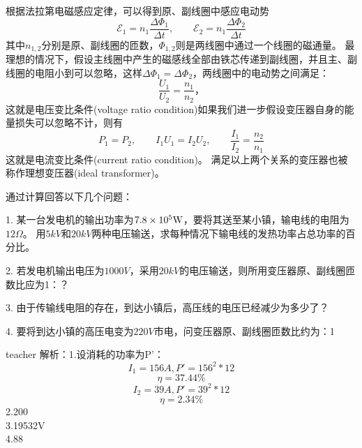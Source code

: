 根据法拉第电磁感应定律，可以得到原、副线圈中感应电动势
\[
\mathcal{E}_1 = n_1\frac{\Delta \Phi_1}{\Delta t},\qquad \mathcal{E}_2 = n_1\frac{\Delta \Phi_2}{\Delta t}
\]
其中$n_{1,2}$分别是原、副线圈的匝数，$\Phi_{1,2}$则是两线圈中通过一个线圈的磁通量。
最理想的情况下，假设主线圈中产生的磁感线全部由铁芯传递到副线圈，并且主、副线圈的电阻小到可以忽略，这样$\Delta\Phi_1 = \Delta \Phi_2$，两线圈中的电动势之间满足：
\begin{equation}
\frac{U_1}{U_2} = \frac{n_1}{n_2}，
\end{equation}
这就是{\heiti 电压变比条件}(voltage ratio condition)如果我们进一步假设变压器自身的能量损失可以忽略不计，则有
\begin{equation}
P_1 =P_2, \qquad I_1U_1 = I_2U_2,\qquad \frac{I_1}{I_2} = \frac{n_2}{n_1}
\end{equation}
这就是{\heiti 电流变比条件}(current ratio condition)。
满足以上两个关系的变压器也被称作{\heiti 理想变压器}(ideal transformer)。



\begin{example}

通过计算回答以下几个问题：

1. 某一台发电机的输出功率为$7.8\times 10^{5}{\rm{W}}$，要将其送至某小镇，输电线的电阻为$12\Omega$。
用$5\unit{kV}$和$20\unit{kV}$两种电压输送，求每种情况下输电线的发热功率占总功率的百分比。

2. 若发电机输出电压为$1000\unit{V}$，采用$20\unit{kV}$的电压输送，则所用变压器原、副线圈匝数比应为1：\kong\kong ？

3. 由于传输线电阻的存在，到达小镇后，高压线的电压已经减少为多少了？

4. 要将到达小镇的高压电变为$220\unit{V}$市电，问变压器原、副线圈匝数比约为\kong ：1
\begin{taggedblock}{teacher}
\newline
解析：1.设消耗的功率为P’：\[I_1=156A,P'=156^2*12\]
\[\eta=37.44\%\]
\[I_2=39A,P'=39^2*12\]
\[\eta=2.34\%\]
2.200
\\3.19532V
\\4.88
\end{taggedblock}
\end{example}


